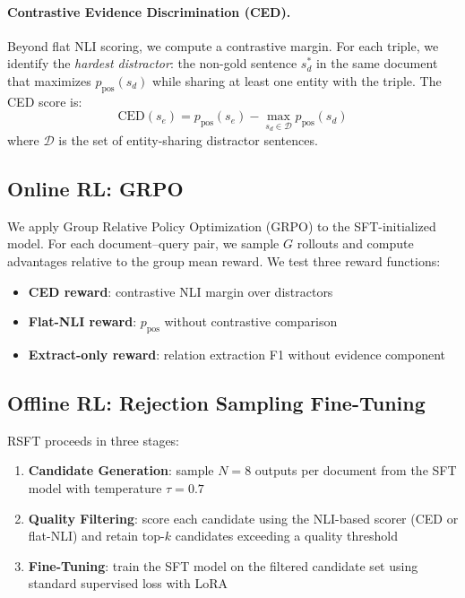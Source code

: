 \documentclass[11pt,a4paper]{article}
\begin{document}
\paragraph{Contrastive Evidence Discrimination (CED).}
Beyond flat NLI scoring, we compute a contrastive margin.
For each triple, we identify the \emph{hardest distractor}: the non-gold sentence $s_d^*$ in the same document that maximizes $p_{\text{pos}}(s_d)$ while sharing at least one entity with the triple.
The CED score is:
\begin{equation}
    \text{CED}(s_e) = p_{\text{pos}}(s_e) - \max_{s_d \in \mathcal{D}} p_{\text{pos}}(s_d)
\end{equation}
where $\mathcal{D}$ is the set of entity-sharing distractor sentences.

\subsection{Online RL: GRPO}
\label{sec:grpo_method}

We apply Group Relative Policy Optimization (GRPO) to the SFT-initialized model.
For each document--query pair, we sample $G$ rollouts and compute advantages relative to the group mean reward.
We test three reward functions:
\begin{itemize}
    \item \textbf{CED reward}: contrastive NLI margin over distractors
    \item \textbf{Flat-NLI reward}: $p_{\text{pos}}$ without contrastive comparison
    \item \textbf{Extract-only reward}: relation extraction F1 without evidence component
\end{itemize}

\subsection{Offline RL: Rejection Sampling Fine-Tuning}
\label{sec:rsft_method}

RSFT proceeds in three stages:
\begin{enumerate}
    \item \textbf{Candidate Generation}: sample $N=8$ outputs per document from the SFT model with temperature $\tau=0.7$
    \item \textbf{Quality Filtering}: score each candidate using the NLI-based scorer (CED or flat-NLI) and retain top-$k$ candidates exceeding a quality threshold
    \item \textbf{Fine-Tuning}: train the SFT model on the filtered candidate set using standard supervised loss with LoRA
\end{enumerate}
\end{document}
